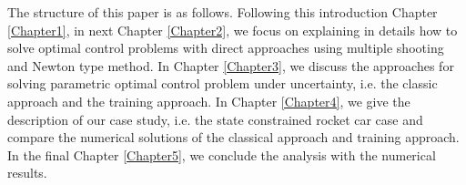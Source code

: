 \documentclass  [
  paper    = a4,
  BCOR     = 10mm,
  twoside,
  fontsize = 12pt,
  fleqn,
  toc      = bibnumbered,
  toc      = listofnumbered,
  numbers  = noendperiod,
  headings = normal,
  listof   = leveldown,
  version  = 3.03
]                                       {scrreprt}
\newcommand{\<}{\langle}
\renewcommand{\>}{\rangle}
\begin{document}


The structure of this paper is as follows. Following this introduction Chapter \ref{Chapter1}, in next Chapter \ref{Chapter2}, we focus on explaining in details how to solve optimal control problems with direct approaches using multiple shooting and Newton type method. In Chapter \ref{Chapter3}, we discuss the approaches for solving parametric optimal control problem under uncertainty, i.e. the classic approach and the training approach. In Chapter \ref{Chapter4}, we give the description of our case study, i.e. the state constrained rocket car case and compare the numerical solutions of the classical approach and training approach. In the final Chapter \ref{Chapter5}, we conclude the analysis with the numerical results. 

\end{document}
